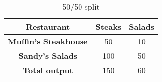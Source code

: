 \begin{table}[h!]
  \centering
    \begin{tabular}{|c|c|c|}
      \hline
      \textbf{Restaurant} & \textbf{Steaks} & \textbf{Salads} \\
      \hline
      \textbf{Muffin's Steakhouse} & 50 & 10 \\
      \hline
      \textbf{Sandy's Salads} & 100 & 50 \\
      \hline
      \textbf{Total output} & 150 & 60 \\
      \hline
    \end{tabular}
    \caption{50/50 split}
    \label{tab:tab3}
  \end{table}